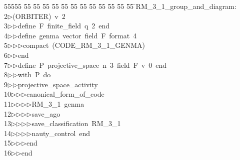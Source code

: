 %
%
\begin{tabbing}
55555 \= 55 \= 55 \= 55 \= 55 \= 55 \= 55 \= 55 \= 55 \= 55 \= 55 \= 55 \= 55 \= \>RM\_3\_1\_group\_and\_diagram:\\[0pt]
2\>$\triangleright$\>(ORBITER)\ v\ 2\ \\[0pt]
3\>$\triangleright$\>$\triangleright$\>define\ F\ finite\_field\ q\ 2\ end\ \\[0pt]
4\>$\triangleright$\>$\triangleright$\>define\ genma\ vector\ field\ F\ format\ 4\ \\[0pt]
5\>$\triangleright$\>$\triangleright$\>$\triangleright$\>compact\ (CODE\_RM\_3\_1\_GENMA)\ \\[0pt]
6\>$\triangleright$\>$\triangleright$\>end\ \\[0pt]
7\>$\triangleright$\>$\triangleright$\>define\ P\ projective\_space\ n\ 3\ field\ F\ v\ 0\ end\ \\[0pt]
8\>$\triangleright$\>$\triangleright$\>with\ P\ do\ \\[0pt]
9\>$\triangleright$\>$\triangleright$\>projective\_space\_activity\ \\[0pt]
10\>$\triangleright$\>$\triangleright$\>$\triangleright$\>canonical\_form\_of\_code\ \\[0pt]
11\>$\triangleright$\>$\triangleright$\>$\triangleright$\>$\triangleright$\>RM\_3\_1\ genma\ \\[0pt]
12\>$\triangleright$\>$\triangleright$\>$\triangleright$\>$\triangleright$\>save\_ago\ \\[0pt]
13\>$\triangleright$\>$\triangleright$\>$\triangleright$\>$\triangleright$\>save\_classification\ RM\_3\_1\ \\[0pt]
14\>$\triangleright$\>$\triangleright$\>$\triangleright$\>$\triangleright$\>nauty\_control\ end\ \\[0pt]
15\>$\triangleright$\>$\triangleright$\>$\triangleright$\>end\ \\[0pt]
16\>$\triangleright$\>$\triangleright$\>end\\[0pt]

\end{tabbing}
